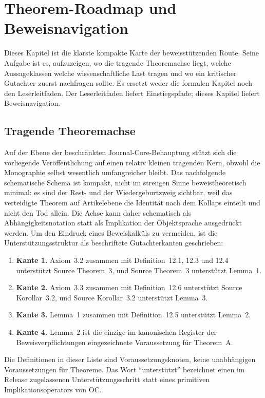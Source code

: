 \section{Theorem-Roadmap und Beweisnavigation}
\label{sec:oc13-theorem-roadmap}

Dieses Kapitel ist die klarste kompakte Karte der beweisstützenden Route. Seine Aufgabe ist es,
aufzuzeigen, wo die tragende Theoremachse liegt, welche Aussageklassen welche wissenschaftliche
Last tragen und wo ein kritischer Gutachter zuerst nachfragen sollte. Es ersetzt weder die formalen
Kapitel noch den Leserleitfaden. Der Leserleitfaden liefert Einstiegspfade; dieses Kapitel liefert
Beweisnavigation.

\subsection{Tragende Theoremachse}

Auf der Ebene der beschränkten Journal-Core-Behauptung stützt sich die vorliegende Veröffentlichung
auf einen relativ kleinen tragenden Kern, obwohl die Monographie selbst wesentlich umfangreicher bleibt.
Das nachfolgende schematische Schema ist kompakt, nicht im strengen Sinne beweistheoretisch minimal:
es sind der Rest- und der Wiedergeburtzweig sichtbar, weil das verteidigte Theorem auf Artikelebene die
Identität nach dem Kollaps einteilt und nicht den Tod allein. Die Achse kann daher schematisch als
Abhängigkeitsnotation statt als Implikation der Objektsprache ausgedrückt werden. Um den Eindruck
eines Beweiskalküls zu vermeiden, ist die Unterstützungsstruktur als beschriftete Gutachterkanten
geschrieben:

\begin{enumerate}
\item \textbf{Kante 1.} Axiom~3.2 zusammen mit Definition~12.1, 12.3 und 12.4 unterstützt Source Theorem~3, und Source Theorem~3 unterstützt Lemma~1.
\item \textbf{Kante 2.} Axiom~3.3 zusammen mit Definition~12.6 unterstützt Source Korollar~3.2, und Source Korollar~3.2 unterstützt Lemma~3.
\item \textbf{Kante 3.} Lemma~1 zusammen mit Definition~12.5 unterstützt Lemma~2.
\item \textbf{Kante 4.} Lemma~2 ist die einzige im kanonischen Register der Beweisverpflichtungen
eingezeichnete Voraussetzung für Theorem~A.
\end{enumerate}

Die Definitionen in dieser Liste sind Voraussetzungsknoten, keine unabhängigen Voraussetzungen
für Theoreme. Das Wort ``unterstützt'' bezeichnet einen im Release zugelassenen Unterstützungsschritt
statt eines primitiven Implikationsoperators von OC.

